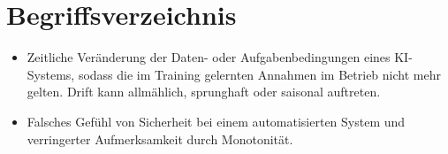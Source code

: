\thispagestyle{empty}

\def\arp{\ac{ARP}\xspace}

\chapter*{Begriffsverzeichnis}\label{cha:Begriffsverzeichnis}


\begin{itemize}\itemsep5pt
\item[\textbf{Drift}] Zeitliche Veränderung der Daten- oder Aufgabenbedingungen eines KI-Systems, sodass die im Training
gelernten Annahmen im Betrieb nicht mehr gelten. Drift kann allmählich, sprunghaft oder saisonal auftreten.

\item[\textbf{Automation-Bias}] Falsches Gefühl von Sicherheit bei einem automatisierten System 
und verringerter Aufmerksamkeit durch Monotonität.

\end{itemize}





\newpage